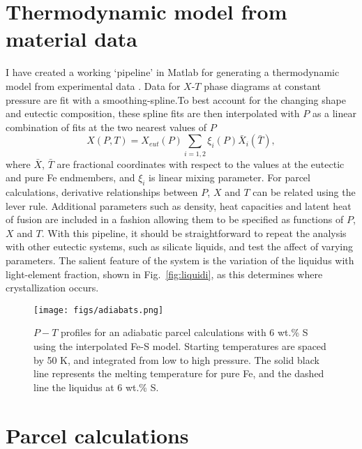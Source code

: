 \section{Thermodynamic model from material data}

I have created a working `pipeline' in Matlab for generating a thermodynamic model from
experimental data \citep{Brett1969,Fei1997,Chen2008,Stewart2007}. Data for 
$X$-$T$ phase diagrams at constant
pressure are fit with a smoothing-spline.To best account for the changing
shape and eutectic composition, these spline fits are then
interpolated with $P$ as a linear combination of fits at the two nearest
values of $P$
\begin{equation}
  X(P,T) = X_{eut}(P)\sum_{i=1,2}\xi_i(P)\bar{X}_i(\bar{T}),
\end{equation}
where $\bar{X}$, $\bar{T}$ are fractional coordinates with respect to the
values at the eutectic and pure Fe endmembers, and $\xi_i$
is linear mixing parameter. For parcel
calculations, derivative relationships between $P$, $X$ and $T$ can be related
using the lever rule. Additional parameters such as density, heat capacities
and latent heat of fusion are included in a fashion allowing them to be
specified as functions of $P$, $X$ and $T$. With this pipeline, it should be
straightforward to repeat the analysis with other eutectic systems, such as
silicate liquids, and test the affect of varying parameters.
The salient feature of the system is the variation of the
liquidus with light-element fraction, shown in Fig.~\ref{fig:liquidi}, as this
determines where crystallization occurs.

 \begin{figure}[h] %
   \centering
   \texttt{[image: figs/adiabats.png]} 
   \caption{$P-T$ profiles for an adiabatic parcel calculations with 6 wt.\% S using the interpolated Fe-S model. Starting 
   temperatures are spaced by 50 K, and integrated from low to high pressure. The solid black line represents 
   the melting temperature for pure Fe, and the dashed line the liquidus at 6 wt.\% S.}
   \label{fig:adiabats}
\end{figure}


\section{Parcel calculations}


